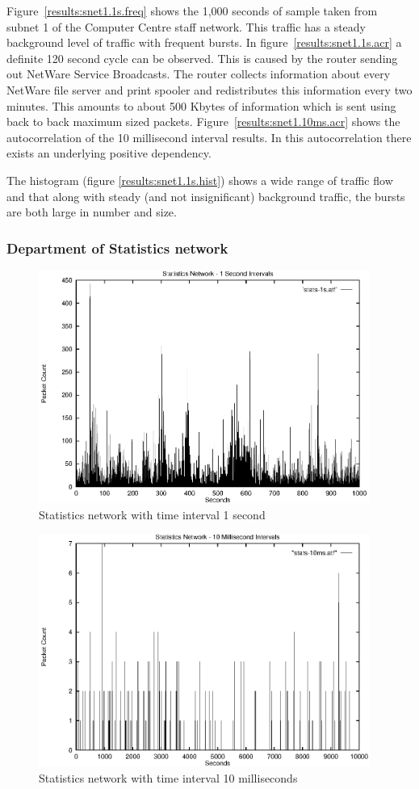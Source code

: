 Figure~\ref{results:snet1.1s.freq} shows the 1,000 seconds of sample
taken from subnet 1 of the Computer Centre staff network.  This
traffic has a steady background level of traffic with frequent bursts.
In figure~\ref{results:snet1.1s.acr} a definite 120 second cycle can
be observed.  This is caused by the router sending out NetWare Service
Broadcasts.  The router collects information about every NetWare file
server and print spooler and redistributes this information every two
minutes.  This amounts to about 500 Kbytes of information which is
sent using back to back maximum sized packets.
Figure~\ref{results:snet1.10ms.acr} shows the autocorrelation of the
10 millisecond interval results.  In this autocorrelation there exists
an underlying positive dependency.

The histogram (figure \ref{results:snet1.1s.hist}) shows a wide range
of traffic flow and that along with steady (and not insignificant)
background traffic, the bursts are both large in number and size.

\subsubsection{Department of Statistics network}

\begin{figure}
\includegraphics[height=3in]{pics/snet93-1s-freq.eps}
\caption{Statistics network with time interval 1 second}
\label{results:snet93.1s.freq}
\end{figure}

\begin{figure}
\includegraphics[height=3in]{pics/snet93-10ms-freq.eps}
\caption{Statistics network with time interval 10 milliseconds}
\label{results:snet93.10ms.freq}
\end{figure}

